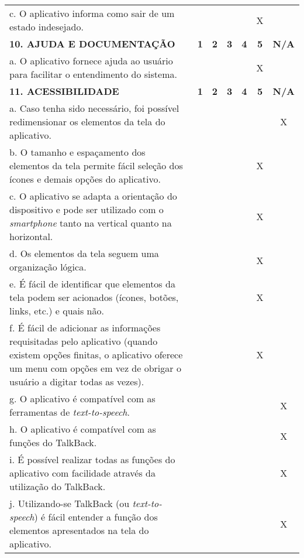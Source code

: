 \documentclass[portuguese,oneside]{tcc}
\begin{document}
\begin{center}
\begin{longtabu}{|L{25em}|c|c|c|c|c|c|}
																							c. O aplicativo informa como sair de um estado indesejado. & & & & & X & \\ 
																							\textbf{10. AJUDA E DOCUMENTAÇÃO} & \textbf{1} & \textbf{2} & \textbf{3} & \textbf{4} & \textbf{5} & \textbf{N/A} \\ 
																							a. O aplicativo fornece ajuda ao usuário para facilitar o entendimento do sistema. & & & & & X & \\ 
																							\textbf{11. ACESSIBILIDADE} & \textbf{1} & \textbf{2} & \textbf{3} & \textbf{4} & \textbf{5} & \textbf{N/A} \\ 
																							a. Caso tenha sido necessário, foi possível redimensionar os elementos da tela do aplicativo. & & & & & & X \\ 
																							b. O tamanho e espaçamento dos elementos da tela permite fácil seleção dos ícones e demais opções do aplicativo. & & & & & X & \\ 
																							c. O aplicativo se adapta a orientação do dispositivo e pode ser utilizado com o \emph{smartphone} tanto na vertical quanto na horizontal. & & & & & X & \\ 
																							d. Os elementos da tela seguem uma organização lógica. & & & & & X & \\ 
																							e. É fácil de identificar que elementos da tela podem ser acionados (ícones, botões, links, etc.) e quais não. & & & & & X & \\ 
																							f. É fácil de adicionar as informações requisitadas pelo aplicativo (quando existem opções finitas, o aplicativo oferece um menu com opções em vez de obrigar o usuário a digitar todas as vezes). & & & & & X & \\ 
																							g. O aplicativo é compatível com as ferramentas de \emph{text-to-speech}. & & & & & & X \\ 
																							h. O aplicativo é compatível com as funções do TalkBack. & & & & & & X \\ 
																							i. É possível realizar todas as funções do aplicativo com facilidade através da utilização do TalkBack.	& & & & & & X \\ 
																							j. Utilizando-se TalkBack (ou \emph{text-to-speech}) é fácil entender a função dos elementos apresentados na tela do aplicativo. & & & & & & X \\ 

\end{longtabu}
\end{center}
\end{document}
